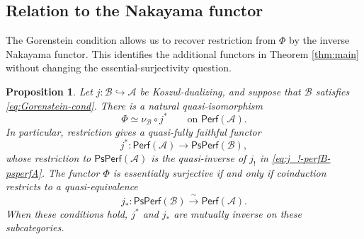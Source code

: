 \documentclass[11pt,letterpaper,reqno]{amsart}
\theoremstyle{plain}
\newtheorem{proposition}[proposition]{Proposition}
\theoremstyle{definition}
\theoremstyle{plain}
\theoremstyle{definition}
\numberwithin{equation}{section}
\begin{document}
\subsection{Relation to the Nakayama functor}

The Gorenstein condition allows us to recover restriction from $\Phi$ by the inverse Nakayama functor.
This identifies the additional functors in Theorem \ref{thm:main} without changing the essential-surjectivity question.

\begin{proposition}\label{prop:restriction}
Let $j:\mathscr B\hookrightarrow\mathscr A$ be Koszul-dualizing, and suppose that $\mathscr B$ satisfies \eqref{eq:Gorenstein-cond}.
There is a natural quasi-isomorphism
\begin{equation}\label{eq:Phi-Nakayama-restriction}
\Phi\simeq\nu_{\mathscr B}\circ j^*
\qquad\text{on }\mathsf{Perf}(\mathscr A).
\end{equation}
In particular, restriction gives a quasi-fully faithful functor
\[
j^*:\mathsf{Perf}(\mathscr A)\longrightarrow\mathsf{PsPerf}(\mathscr B),
\]
whose restriction to $\mathsf{PsPerf}(\mathscr A)$ is the quasi-inverse of $j_!$ in \eqref{eq:j_!-perfB-psperfA}.
The functor $\Phi$ is essentially surjective if and only if coinduction restricts to a quasi-equivalence
\begin{equation}\label{eq:j_*PsPerfB-in-PerfA}
j_*:\mathsf{PsPerf}(\mathscr B)\xrightarrow{\;\sim\;}\mathsf{Perf}(\mathscr A).
\end{equation}
When these conditions hold, $j^*$ and $j_*$ are mutually inverse on these subcategories.
\end{proposition}
\end{document}
